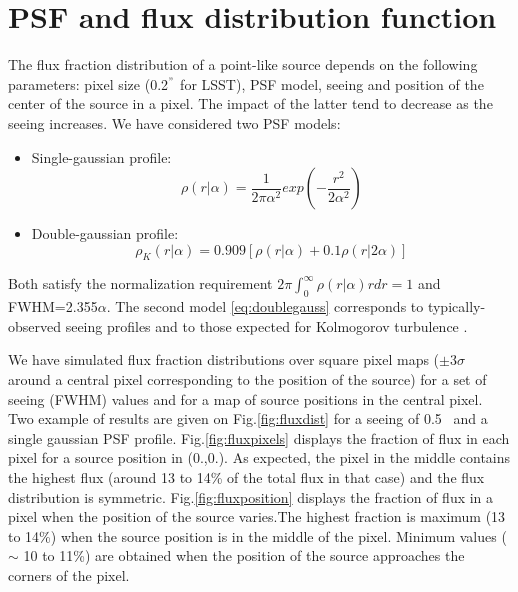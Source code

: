 \documentclass[\docopts]{\docclass}
\begin{document}
\section{PSF and flux distribution function}
\label{sec:psfflux}
The flux fraction distribution of a point-like source depends on the following  parameters: pixel size (0.2$^{"}$ for LSST), PSF model, seeing and position of the center of the source in a pixel. The impact of the latter tend to decrease as the seeing increases. We have considered two PSF models:
\begin{itemize}
\item Single-gaussian profile:
  \begin{equation}
    \rho(r|\alpha)={\frac{1}{2\pi\alpha^2}}exp\left(-{\frac{r^2}{2\alpha^2}}\right) \label{eq:singlegauss}
   \end{equation}
\item Double-gaussian profile:
\begin{equation}
  \rho_K(r|\alpha)= 0.909 \left[\rho(r|\alpha)+0.1\rho(r|2\alpha)\right] \label{eq:doublegauss}
  \end{equation}
 \end{itemize}
Both satisfy the normalization requirement $ 2\pi \int^{\infty}_{0} \rho(r|\alpha) r dr = 1$ and FWHM=2.355$\alpha$. The second model \eqref{eq:doublegauss} corresponds to typically-observed seeing profiles and to those expected for Kolmogorov turbulence \cite{LSE40}. \par
We have simulated flux fraction distributions over square pixel maps ($\pm 3 \sigma$ around a central pixel corresponding to the position of the source) for a set of seeing (FWHM) values and for a map of source positions in the central pixel.  Two example of results are given on Fig.\ref{fig:fluxdist} for a seeing of 0.5\arcsec~ and a single gaussian PSF profile. Fig.\ref{fig:fluxpixels} displays the fraction of flux in each pixel for a source position in (0.,0.). As expected, the pixel in the middle contains the highest flux (around 13 to 14\% of the total flux in that case) and the flux distribution is symmetric.  Fig.\ref{fig:fluxposition} displays the fraction of flux in a pixel when the position of the source varies.The highest fraction is maximum (13 to 14\%) when the source position is in the middle of the pixel. Minimum values ($\sim$ 10 to 11\%) are obtained when the position of the source approaches the corners of the pixel.
\end{document}
